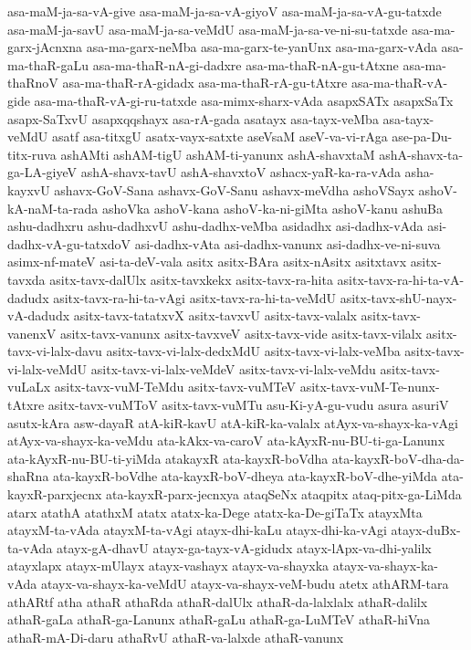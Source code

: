 {asa-maM-ja-sa-vA-give
asa-maM-ja-sa-vA-giyoV
asa-maM-ja-sa-vA-gu-tatxde
asa-maM-ja-savU
asa-maM-ja-sa-veMdU
asa-maM-ja-sa-ve-ni-su-tatxde
asa-ma-garx-jAcnxna
asa-ma-garx-neMba
asa-ma-garx-te-yanUnx
asa-ma-garx-vAda
asa-ma-thaR-gaLu
asa-ma-thaR-nA-gi-dadxre
asa-ma-thaR-nA-gu-tAtxne
asa-ma-thaRnoV
asa-ma-thaR-rA-gidadx
asa-ma-thaR-rA-gu-tAtxre
asa-ma-thaR-vA-gide
asa-ma-thaR-vA-gi-ru-tatxde
asa-mimx-sharx-vAda
asapxSATx
asapxSaTx
asapx-SaTxvU
asapxqqshayx
asa-rA-gada
asatayx
asa-tayx-veMba
asa-tayx-veMdU
asatf
asa-titxgU
asatx-vayx-satxte
aseVsaM
aseV-va-vi-rAga
ase-pa-Du-titx-ruva
ashAMti
ashAM-tigU
ashAM-ti-yanunx
ashA-shavxtaM
ashA-shavx-ta-ga-LA-giyeV
ashA-shavx-tavU
ashA-shavxtoV
ashacx-yaR-ka-ra-vAda
asha-kayxvU
ashavx-GoV-Sana
ashavx-GoV-Sanu
ashavx-meVdha
ashoVSayx
ashoV-kA-naM-ta-rada
ashoVka
ashoV-kana
ashoV-ka-ni-giMta
ashoV-kanu
ashuBa
ashu-dadhxru
ashu-dadhxvU
ashu-dadhx-veMba
asidadhx
asi-dadhx-vAda
asi-dadhx-vA-gu-tatxdoV
asi-dadhx-vAta
asi-dadhx-vanunx
asi-dadhx-ve-ni-suva
asimx-nf-mateV
asi-ta-deV-vala
asitx
asitx-BAra
asitx-nAsitx
asitxtavx
asitx-tavxda
asitx-tavx-dalUlx
asitx-tavxkekx
asitx-tavx-ra-hita
asitx-tavx-ra-hi-ta-vA-dadudx
asitx-tavx-ra-hi-ta-vAgi
asitx-tavx-ra-hi-ta-veMdU
asitx-tavx-shU-nayx-vA-dadudx
asitx-tavx-tatatxvX
asitx-tavxvU
asitx-tavx-valalx
asitx-tavx-vanenxV
asitx-tavx-vanunx
asitx-tavxveV
asitx-tavx-vide
asitx-tavx-vilalx
asitx-tavx-vi-lalx-davu
asitx-tavx-vi-lalx-dedxMdU
asitx-tavx-vi-lalx-veMba
asitx-tavx-vi-lalx-veMdU
asitx-tavx-vi-lalx-veMdeV
asitx-tavx-vi-lalx-veMdu
asitx-tavx-vuLaLx
asitx-tavx-vuM-TeMdu
asitx-tavx-vuMTeV
asitx-tavx-vuM-Te-nunx-tAtxre
asitx-tavx-vuMToV
asitx-tavx-vuMTu
asu-Ki-yA-gu-vudu
asura
asuriV
asutx-kAra
asw-dayaR
atA-kiR-kavU
atA-kiR-ka-valalx
atAyx-va-shayx-ka-vAgi
atAyx-va-shayx-ka-veMdu
ata-kAkx-va-caroV
ata-kAyxR-nu-BU-ti-ga-Lanunx
ata-kAyxR-nu-BU-ti-yiMda
atakayxR
ata-kayxR-boVdha
ata-kayxR-boV-dha-da-shaRna
ata-kayxR-boVdhe
ata-kayxR-boV-dheya
ata-kayxR-boV-dhe-yiMda
ata-kayxR-parxjecnx
ata-kayxR-parx-jecnxya
ataqSeNx
ataqpitx
ataq-pitx-ga-LiMda
atarx
atathA
atathxM
atatx
atatx-ka-Dege
atatx-ka-De-giTaTx
atayxMta
atayxM-ta-vAda
atayxM-ta-vAgi
atayx-dhi-kaLu
atayx-dhi-ka-vAgi
atayx-duBx-ta-vAda
atayx-gA-dhavU
atayx-ga-tayx-vA-gidudx
atayx-lApx-va-dhi-yalilx
atayxlapx
atayx-mUlayx
atayx-vashayx
atayx-va-shayxka
atayx-va-shayx-ka-vAda
atayx-va-shayx-ka-veMdU
atayx-va-shayx-veM-budu
atetx
athARM-tara
athARtf
atha
athaR
athaRda
athaR-dalUlx
athaR-da-lalxlalx
athaR-dalilx
athaR-gaLa
athaR-ga-Lanunx
athaR-gaLu
athaR-ga-LuMTeV
athaR-hiVna
athaR-mA-Di-daru
athaRvU
athaR-va-lalxde
athaR-vanunx
}
